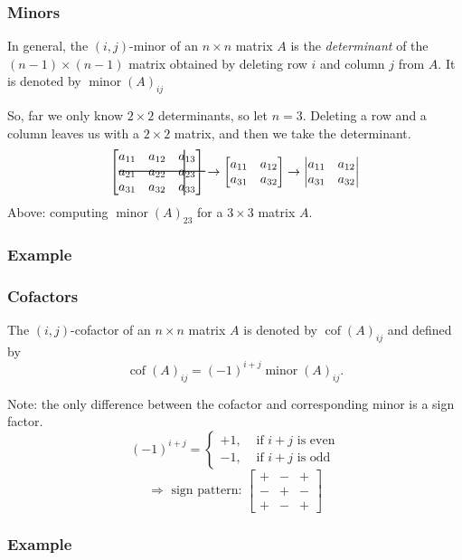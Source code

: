 \documentclass[11pt,t]{beamer}
\DeclareMathOperator{\minor}{minor}
\DeclareMathOperator{\cof}{cof}
\begin{document}
\begin{frame}
\frametitle{Minors}
In general, the \alert{$(i,j)$-minor} of an $n\times n$ matrix $A$ is the {\em determinant} of the $(n-1)\times (n-1)$ matrix obtained by deleting row $i$ and column $j$ from $A$. It is denoted by $\minor(A)_{ij}$

\medskip

So, far we only know $2\times 2$ determinants, so let $n=3$. Deleting a row and a column leaves us with a $2\times 2$ matrix, and then we take the determinant. 
\[
\begin{bmatrix}a_{11}&a_{12}&a_{13}\\
    \makebox[0pt][l]{\rule[0.1cm]{0.2\textwidth}{0.7pt}} a_{21}&a_{22}&a_{23}\makebox(-18,0){\rule[1ex]{0.7pt}{3\normalbaselineskip}}\\
a_{31}&a_{32}&a_{33}\end{bmatrix}\to \begin{bmatrix}a_{11}&a_{12}\\a_{31}&a_{32}\end{bmatrix}\to \begin{vmatrix}a_{11}&a_{12}\\a_{31}&a_{32}\end{vmatrix}
\]
Above: computing $\minor(A)_{23}$ for a $3\times 3$ matrix $A$.
\end{frame}
\begin{frame}
\frametitle{Example}

\end{frame}
\begin{frame}
\frametitle{Cofactors}
\begin{definition}
The \alert{$(i,j)$-cofactor} of an $n\times n$ matrix $A$ is denoted by $\cof(A)_{ij}$ and defined by
\[
\cof(A)_{ij} = (-1)^{i+j}\minor(A)_{ij}.
\]
\end{definition}
Note: the only difference between the cofactor and corresponding minor is a sign factor.
\[
(-1)^{i+j} = \begin{cases}+1, & \text{ if } i+j \text{ is even}\\
-1, & \text{ if } i+j \text{ is odd}\end{cases}\]
\[ \Rightarrow \text{  sign pattern: } \begin{bmatrix}+&-&+\\-&+&-\\+&-&+\end{bmatrix}
\]
\end{frame}
\begin{frame}
\frametitle{Example}

\end{frame}
\end{document}
